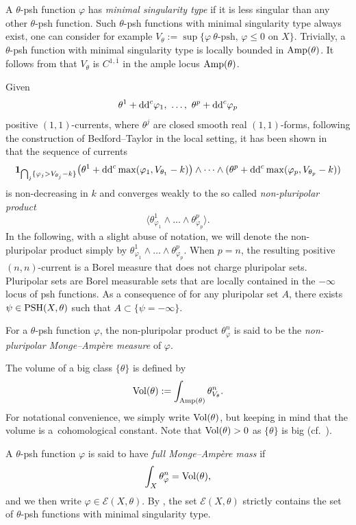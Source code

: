 \documentclass[pdftex]{sigma}
\numberwithin{equation}{section}
\theoremstyle{plain}
\newcommand \psh {{\rm PSH}}
\newcommand \Amp {{\rm Amp}}
\begin{document}
A $\theta$-psh function $\varphi$ has \emph{minimal singularity type} if it is less singular than any other $\theta$-psh function. Such $\theta$-psh functions with minimal singularity type always exist, one can consider for example $V_\theta:=\sup \{ \varphi \ \theta\text{-psh},\, \varphi\le 0\text{ on } X \}$. Trivially, a $\theta$-psh function with minimal singularity type is locally bounded in $\Amp(\theta)$. It follows from \cite[Theorem~1.1]{DNT23} that $V_{\theta}$ is $C^{1, \bar{1}}$ in the ample locus ${\rm Amp}(\theta)$.

Given
\[\theta^1+{\rm dd}^c\varphi_1, \ \dots, \ \theta^p+{\rm dd}^c \varphi_p\] positive $(1,1)$-currents, where $\theta^j$ are closed smooth real $(1,1)$-forms, following the construction of Bedford--Taylor \cite{BT87} in the local setting, it has been shown in~\cite{BEGZ10} that the sequence of currents
\[
{\bf 1}_{\bigcap_j\{\varphi_j>V_{\theta_j}-k\}}\big(\theta^1+{\rm dd}^c \max(\varphi_1, V_{\theta_1}-k)\big)\wedge\dots\wedge (\theta^p+{\rm dd}^c\max(\varphi_p, V_{\theta_p}-k))
\]
is non-decreasing in $k$ and converges weakly to the so called \emph{non-pluripolar product}
\[%
\big\langle \theta^1_{\varphi_1 } \wedge\dots\wedge\theta^p_{\varphi_p}\big\rangle .
\]
In the following, with a slight abuse of notation, we will denote the non-pluripolar product simply by $\theta^1_{\varphi_1 } \wedge\dots\wedge\theta^p_{\varphi_p}$.
When $p =n$, the resulting positive $(n,n)$-current is a Borel measure that does not charge pluripolar sets. Pluripolar sets are Borel measurable sets that are locally contained in the $-\infty$ locus of psh functions. As a consequence of \cite[Corollary 2.11]{BBGZ13} for any pluripolar set $A$, there exists $\psi\in \psh(X,\theta)$ such that $A\subset \{\psi=-\infty\}$.

For a $\theta$-psh function $\varphi$, the non-pluripolar product $\theta_\varphi^n$ is said to be the \emph{non-pluripolar Monge--Amp{\`e}re measure} of $\varphi$.

The volume of a big class $\{ \theta\}$ is defined by
\[
{\rm Vol}(\theta):= \int_{{\rm Amp}(\theta)} \theta_{V_\theta}^n.
\]
For notational convenience, we simply write ${\rm Vol}(\theta)$, but keeping in mind that the volume is a~cohomological constant. Note that ${\rm Vol}(\theta)>0$ as $\{\theta\}$ is big (cf.\ \cite{BEGZ10}).

A $\theta$-psh function $\varphi$ is said to have \emph{full Monge--Amp\`ere mass} if
\[
\int_X \theta_\varphi^n={\rm Vol}(\theta),
\]
and we then write $\varphi\in \mathcal{E}(X,\theta)$. By \cite[Theorem 1.16]{BEGZ10}, the set $\mathcal{E}(X,\theta)$ strictly contains the set of $\theta$-psh functions with minimal singularity type.
\end{document}
